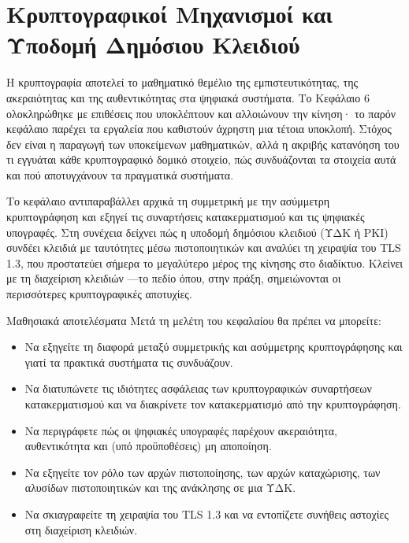 \chapter{Κρυπτογραφικοί Μηχανισμοί και Υποδομή Δημόσιου Κλειδιού}\label{ch:7}

Η κρυπτογραφία αποτελεί το μαθηματικό θεμέλιο της εμπιστευτικότητας, της ακεραιότητας και της αυθεντικότητας στα ψηφιακά συστήματα. Το Κεφάλαιο 6 ολοκληρώθηκε με επιθέσεις που υποκλέπτουν και αλλοιώνουν την κίνηση· το παρόν κεφάλαιο παρέχει τα εργαλεία που καθιστούν άχρηστη μια τέτοια υποκλοπή. Στόχος δεν είναι η παραγωγή των υποκείμενων μαθηματικών, αλλά η ακριβής κατανόηση του τι εγγυάται κάθε κρυπτογραφικό δομικό στοιχείο, πώς συνδυάζονται τα στοιχεία αυτά και πού αποτυγχάνουν τα πραγματικά συστήματα.

Το κεφάλαιο αντιπαραβάλλει αρχικά τη συμμετρική με την ασύμμετρη κρυπτογράφηση και εξηγεί τις συναρτήσεις κατακερματισμού και τις ψηφιακές υπογραφές. Στη συνέχεια δείχνει πώς η υποδομή δημόσιου κλειδιού (ΥΔΚ ή PKI) συνδέει κλειδιά με ταυτότητες μέσω πιστοποιητικών και αναλύει τη χειραψία του TLS 1.3, που προστατεύει σήμερα το μεγαλύτερο μέρος της κίνησης στο διαδίκτυο. Κλείνει με τη διαχείριση κλειδιών —το πεδίο όπου, στην πράξη, σημειώνονται οι περισσότερες κρυπτογραφικές αποτυχίες.

\begin{outcomesbox}{Μαθησιακά αποτελέσματα}
Μετά τη μελέτη του κεφαλαίου θα πρέπει να μπορείτε:
\begin{itemize}
  \item Να εξηγείτε τη διαφορά μεταξύ συμμετρικής και ασύμμετρης κρυπτογράφησης και γιατί τα πρακτικά συστήματα τις συνδυάζουν.
  \item Να διατυπώνετε τις ιδιότητες ασφάλειας των κρυπτογραφικών συναρτήσεων κατακερματισμού και να διακρίνετε τον κατακερματισμό από την κρυπτογράφηση.
  \item Να περιγράφετε πώς οι ψηφιακές υπογραφές παρέχουν ακεραιότητα, αυθεντικότητα και (υπό προϋποθέσεις) μη αποποίηση.
  \item Να εξηγείτε τον ρόλο των αρχών πιστοποίησης, των αρχών καταχώρισης, των αλυσίδων πιστοποιητικών και της ανάκλησης σε μια ΥΔΚ.
  \item Να σκιαγραφείτε τη χειραψία του TLS 1.3 και να εντοπίζετε συνήθεις αστοχίες στη διαχείριση κλειδιών.
\end{itemize}
\end{outcomesbox}

